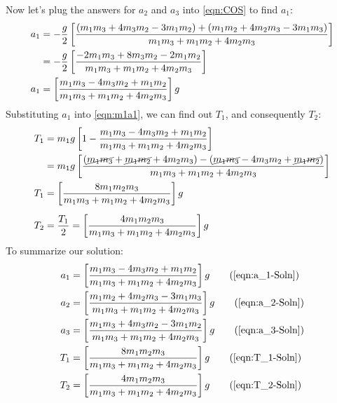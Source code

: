 \documentclass[11pt]{article}
\begin{document}
	\pagebreak
	Now let's plug the answers for $a_2$ and $a_3$ into \eqref{eqn:COS} to find $a_1$:
	\begin{align}
		a_1 &= -\frac{g}{2}\left[\frac{(m_1m_3 + 4m_3m_2-3m_1m_2) + (m_1m_2+4m_2m_3-3m_1m_3)}{m_1m_3+m_1m_2+4m_2m_3}\right] \notag \\
		&= -\frac{g}{2}\left[\frac{-2m_1m_3 + 8m_3m_2-2m_1m_2}{m_1m_3+m_1m_2+4m_2m_3}\right] \notag \\
		a_1 &= \left[\frac{m_1m_3 - 4m_3m_2+m_1m_2}{m_1m_3+m_1m_2+4m_2m_3}\right]g \label{eqn:a_1-Soln}
	\end{align}
	Substituting $a_1$ into \eqref{eqn:m1a1}, we can find out $T_1$, and consequently $T_2$:
	\begin{align}
		T_1 &= m_1g\left[1-\frac{m_1m_3 - 4m_3m_2+m_1m_2}{m_1m_3+m_1m_2+4m_2m_3}\right] \notag \\
		&=m_1g\left[\frac{(\cancel{m_1m_3}+\cancel{m_1m_2}+4m_2m_3)-(\cancel{m_1m_3} - 4m_3m_2+\cancel{m_1m_2})}{m_1m_3+m_1m_2+4m_2m_3}\right] \notag \\
		T_1 &= \left[\frac{8m_1m_2m_3}{m_1m_3+m_1m_2+4m_2m_3}\right]g \label{eqn:T_1-Soln} \\[0.5em]
		T_2 &= \frac{T_1}{2} = \left[\frac{4m_1m_2m_3}{m_1m_3+m_1m_2+4m_2m_3}\right]g \label{eqn:T_2-Soln}
	\end{align}
	To summarize our solution:
	\begin{align*}
		a_1 &= \left[\frac{m_1m_3 - 4m_3m_2+m_1m_2}{m_1m_3+m_1m_2+4m_2m_3}\right]g \tag{\ref{eqn:a_1-Soln}} \\
		a_2 &= \left[\frac{m_1m_2+4m_2m_3-3m_1m_3}{m_1m_3+m_1m_2+4m_2m_3}\right]g \tag{\ref{eqn:a_2-Soln}} \\
		a_3 &= \left[\frac{m_1m_3 + 4m_3m_2-3m_1m_2}{m_1m_3+m_1m_2+4m_2m_3}\right]g \tag{\ref{eqn:a_3-Soln}} \\
		T_1 &= \left[\frac{8m_1m_2m_3}{m_1m_3+m_1m_2+4m_2m_3}\right]g \tag{\ref{eqn:T_1-Soln}} \\
		T_2 &= \left[\frac{4m_1m_2m_3}{m_1m_3+m_1m_2+4m_2m_3}\right]g \tag{\ref{eqn:T_2-Soln}}
	\end{align*}
	
	\pagebreak
\end{document}
